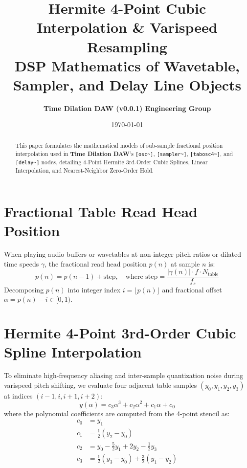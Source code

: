 \documentclass[11pt,a4paper]{article}
\title{\textbf{\Huge Hermite 4-Point Cubic Interpolation \& Varispeed Resampling}\\[0.5em]
\Large DSP Mathematics of Wavetable, Sampler, and Delay Line Objects}
\author{\textbf{Time Dilation DAW (v0.0.1) Engineering Group}}
\date{\today}
\begin{document}
\maketitle

\begin{abstract}
This paper formulates the mathematical models of sub-sample fractional position interpolation used in \textbf{Time Dilation DAW}'s \texttt{[osc\textasciitilde{}]}, \texttt{[sampler\textasciitilde{}]}, \texttt{[tabosc4\textasciitilde{}]}, and \texttt{[delay\textasciitilde{}]} nodes, detailing 4-Point Hermite 3rd-Order Cubic Splines, Linear Interpolation, and Nearest-Neighbor Zero-Order Hold.
\end{abstract}

\section{Fractional Table Read Head Position}
When playing audio buffers or wavetables at non-integer pitch ratios or dilated time speeds $\gamma$, the fractional read head position $p(n)$ at sample $n$ is:
\begin{equation}
p(n) = p(n-1) + \text{step}, \quad \text{where } \text{step} = \frac{|\gamma(n)| \cdot f \cdot N_{\text{table}}}{f_s}
\end{equation}
Decomposing $p(n)$ into integer index $i = \lfloor p(n) \rfloor$ and fractional offset $\alpha = p(n) - i \in [0, 1)$.

\section{Hermite 4-Point 3rd-Order Cubic Spline Interpolation}
To eliminate high-frequency aliasing and inter-sample quantization noise during varispeed pitch shifting, we evaluate four adjacent table samples $(y_0, y_1, y_2, y_3)$ at indices $(i-1, i, i+1, i+2)$:
\begin{equation}
y(\alpha) = c_3 \alpha^3 + c_2 \alpha^2 + c_1 \alpha + c_0
\end{equation}
where the polynomial coefficients are computed from the 4-point stencil as:
\begin{align}
c_0 &= y_1 \\
c_1 &= \frac{1}{2}(y_2 - y_0) \\
c_2 &= y_0 - \frac{5}{2} y_1 + 2 y_2 - \frac{1}{2} y_3 \\
c_3 &= \frac{1}{2}(y_3 - y_0) + \frac{3}{2}(y_1 - y_2)
\end{align}
\end{document}
